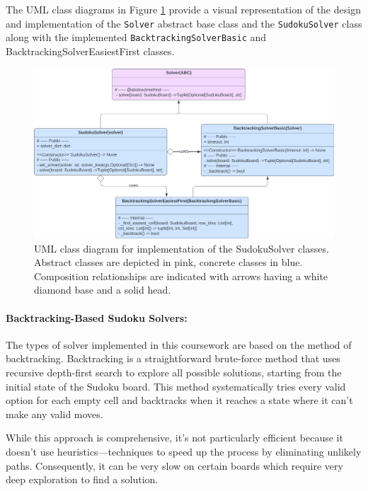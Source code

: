\documentclass[11pt]{article}
\begin{document}
The UML class diagrams in Figure \ref{fig:sudoku_solver_uml} provide a visual representation of the design and implementation of the \texttt{Solver} abstract base class and the \texttt{SudokuSolver} class along with the implemented \texttt{BacktrackingSolverBasic} and {BacktrackingSolverEasiestFirst} classes.

\begin{figure}[H]
    \centering
    \includegraphics[width=1\textwidth]{figs/UML_sudoku_solver.png}
    \caption{UML class diagram for implementation of the SudokuSolver classes. Abstract classes are depicted in pink, concrete classes in blue. Composition relationships are indicated with arrows having a white diamond base and a solid head.}
    \label{fig:sudoku_solver_uml}
\end{figure}

\paragraph{Backtracking-Based Sudoku Solvers:}

The types of solver implemented in this coursework are based on the method of backtracking. Backtracking is a straightforward brute-force method that uses recursive depth-first search to explore all possible solutions, starting from the initial state of the Sudoku board. This method systematically tries every valid option for each empty cell and backtracks when it reaches a state where it can't make any valid moves.

While this approach is comprehensive, it's not particularly efficient because it doesn't use heuristics—techniques to speed up the process by eliminating unlikely paths. Consequently, it can be very slow on certain boards which require very deep exploration to find a solution. 
\end{document}

